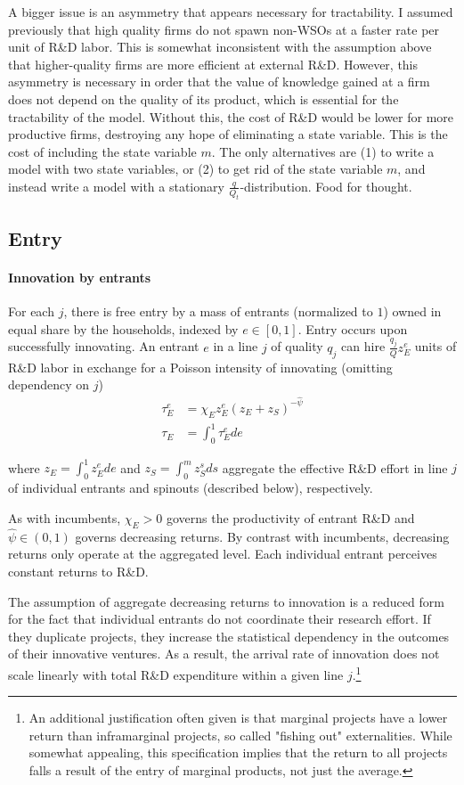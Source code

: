 \documentclass[12pt,english]{article}
\theoremstyle{remark}
\begin{document}
A bigger issue is an asymmetry that appears necessary for tractability. I assumed previously that high quality firms do not spawn non-WSOs at a faster rate per unit of R\&D labor. This is somewhat inconsistent with the assumption above that higher-quality firms are more efficient at external R\&D. However, this asymmetry is necessary in order that the value of knowledge gained at a firm does not depend on the quality of its product, which is essential for the tractability of the model. Without this, the cost of R\&D would be lower for more productive firms, destroying any hope of eliminating a state variable. This is the cost of including the state variable $m$. The only alternatives are (1) to write a model with two state variables, or (2) to get rid of the state variable $m$, and instead write a model with a stationary $\frac{q}{Q_t}$-distribution. Food for thought.


\subsection{Entry} 

\paragraph{Innovation by entrants} For each $j$, there is free entry by a mass of entrants (normalized to $1$) owned in equal share by the households, indexed by $e \in [0,1]$. Entry occurs upon successfully innovating. An entrant $e$ in a line $j$ of quality $q_j$ can hire $\frac{q_j}{Q} z_E^e$ units of R\&D labor in exchange for a Poisson intensity of innovating (omitting dependency on $j$)
\begin{align}
\tau_E^e &= \chi_E z_E^e (z_E + z_S)^{-\hat{\psi}} \label{simplified_entrant_innovation_rate} \\
\tau_E &= \int_0^1 \tau_E^e de \nonumber
\end{align}

where $z_E = \int_0^1 z_E^e de$ and $z_S = \int_0^{m} z_S^s ds$ aggregate the effective R\&D effort in line $j$ of individual entrants and spinouts (described below), respectively. 

As with incumbents, $\chi_E > 0$ governs the productivity of entrant R\&D and $\hat{\psi} \in (0,1)$ governs decreasing returns. By contrast with incumbents, decreasing returns only operate at the aggregated level. Each individual entrant perceives constant returns to R\&D. 

The assumption of aggregate decreasing returns to innovation is a reduced form for the fact that individual entrants do not coordinate their research effort. If they duplicate projects, they increase the statistical dependency in the outcomes of their innovative ventures. As a result, the arrival rate of innovation does not scale linearly with total R\&D expenditure within a given line $j$.\footnote{An additional justification often given is that marginal projects have a lower return than inframarginal projects, so called "fishing out" externalities. While somewhat appealing, this specification implies that the return to all projects falls a result of the entry of marginal products, not just the average.}
\end{document}
